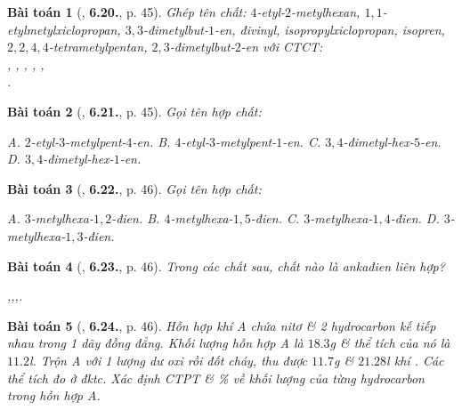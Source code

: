 \documentclass{article}
\numberwithin{equation}{section}
\newtheorem{baitoan}{Bài toán}[section]
\begin{document}
\begin{baitoan}[\cite{SBT_Hoa_Hoc_11_co_ban}, \textbf{6.20.}, p. 45]
	Ghép tên chất: $4$-etyl-$2$-metylhexan, $1,1$-etylmetylxiclopropan, $3,3$-đimetylbut-$1$-en, đivinyl, isopropylxiclopropan, isopren, $2,2,4,4$-tetrametylpentan, $2,3$-đimetylbut-$2$-en với CTCT:\\\emph{,  , , , },\\\emph{}.
\end{baitoan}

\begin{baitoan}[\cite{SBT_Hoa_Hoc_11_co_ban}, \textbf{6.21.}, p. 45]
	Gọi tên hợp chất:
	\begin{center}
	\end{center}
	{\sf A.} $2$-etyl-$3$-metylpent-$4$-en. {\sf B.} $4$-etyl-$3$-metylpent-$1$-en. {\sf C.} $3,4$-đimetyl-hex-$5$-en. {\sf D.} $3,4$-đimetyl-hex-$1$-en.
\end{baitoan}

\begin{baitoan}[\cite{SBT_Hoa_Hoc_11_co_ban}, \textbf{6.22.}, p. 46]
	Gọi tên hợp chất:
	\begin{center}
	\end{center}
	{\sf A.} $3$-metylhexa-$1,2$-đien. {\sf B.} $4$-metylhexa-$1,5$-đien. {\sf C.} $3$-metylhexa-$1,4$-đien. {\sf D.} $3$-metylhexa-$1,3$-đien.
\end{baitoan}

\begin{baitoan}[\cite{SBT_Hoa_Hoc_11_co_ban}, \textbf{6.23.}, p. 46]
	Trong các chất sau, chất nào là ankađien liên hợp?
	\begin{center}
		,\hspace{5mm},\hspace{5mm}\emph{},\hspace{5mm}\emph{}.
	\end{center}
\end{baitoan}

\begin{baitoan}[\cite{SBT_Hoa_Hoc_11_co_ban}, \textbf{6.24.}, p. 46]
	Hỗn hợp khí A chứa nitơ \& 2 hydrocarbon kế tiếp nhau trong 1 dãy đồng đẳng. Khối lượng hỗn hợp A là $18.3$\emph{g} \& thể tích của nó là $11.2$\emph{l}. Trộn A với 1 lượng dư oxi rồi đốt cháy, thu được $11.7$\emph{g} \emph{} \& $21.28$\emph{l} khí \emph{}. Các thể tích đo ở đktc. Xác định CTPT \& \% về khối lượng của từng hydrocarbon trong hỗn hợp A.
\end{baitoan}
\end{document}
